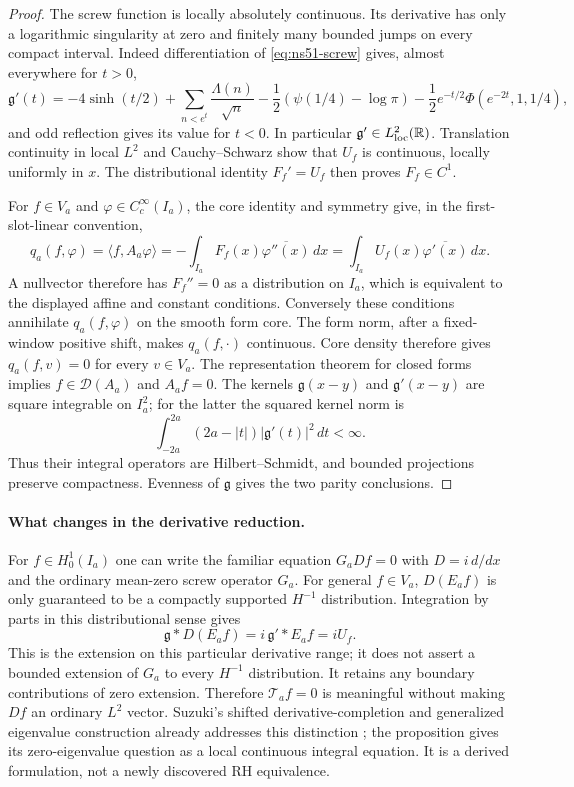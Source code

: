 \begin{proof}
The screw function is locally absolutely continuous. Its derivative
has only a logarithmic singularity at zero and finitely many bounded
jumps on every compact interval. Indeed differentiation of
\eqref{eq:ns51-screw} gives, almost everywhere for $t>0$,
\begin{equation}\label{eq:ns51-screw-derivative}
 \mathfrak g'(t)=-4\sinh(t/2)
 +\sum_{n<e^t}\frac{\Lambda(n)}{\sqrt n}
 -\frac12(\psi(1/4)-\log\pi)
 -\frac12e^{-t/2}\Phi(e^{-2t},1,1/4),
\end{equation}
and odd reflection gives its value for $t<0$.
In particular $\mathfrak g'\in L^2_{\rm loc}(\mathbb R)$.
Translation continuity in local $L^2$ and Cauchy--Schwarz show that
$U_f$ is continuous, locally uniformly in $x$. The distributional
identity $F_f'=U_f$ then proves $F_f\in C^1$.

For $f\in V_a$ and $\varphi\in C_c^\infty(I_a)$, the core identity
and symmetry give, in the first-slot-linear convention,
\[
 q_a(f,\varphi)=\langle f,A_a\varphi\rangle
 =-\int_{I_a}F_f(x)\overline{\varphi''(x)}\,dx
 =\int_{I_a}U_f(x)\overline{\varphi'(x)}\,dx.
\]
A nullvector therefore has $F_f''=0$ as a distribution on $I_a$,
which is equivalent to the displayed affine and constant conditions.
Conversely these conditions annihilate $q_a(f,\varphi)$ on the smooth
form core. The form norm, after a fixed-window positive shift, makes
$q_a(f,\cdot)$ continuous. Core density therefore gives
$q_a(f,v)=0$ for every $v\in V_a$. The representation theorem for
closed forms implies $f\in\mathcal D(A_a)$ and $A_af=0$.
The kernels $\mathfrak g(x-y)$ and $\mathfrak g'(x-y)$ are square
integrable on $I_a^2$; for the latter the squared kernel norm is
\[
 \int_{-2a}^{2a}(2a-|t|)|\mathfrak g'(t)|^2\,dt<\infty.
\]
Thus their integral operators are Hilbert--Schmidt, and bounded
projections preserve compactness. Evenness of $\mathfrak g$ gives
the two parity conclusions.
\end{proof}

\paragraph{What changes in the derivative reduction.}
For $f\in H_0^1(I_a)$ one can write the familiar equation
$G_a Df=0$ with $D=i\,d/dx$ and the ordinary mean-zero screw operator
$G_a$. For general $f\in V_a$, $D(E_af)$ is only guaranteed to be a
compactly supported $H^{-1}$ distribution. Integration by parts in
this distributional sense gives
\[
 \mathfrak g*D(E_af)=i\,\mathfrak g'*E_af=iU_f.
\]
This is the extension on this particular derivative range; it does
not assert a bounded extension of $G_a$ to every $H^{-1}$ distribution.
It retains any boundary contributions of zero extension. Therefore
$\mathcal T_af=0$ is meaningful without making $Df$ an ordinary
$L^2$ vector. Suzuki's shifted derivative-completion and generalized
eigenvalue construction already addresses this distinction
\cite[Sections 8.3--8.5]{Suzuki2026}; the proposition gives its
zero-eigenvalue question as a local continuous integral equation.
It is a derived formulation, not a newly discovered RH equivalence.

